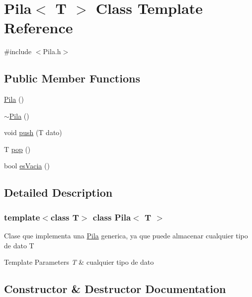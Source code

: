 \hypertarget{class_pila}{}\section{Pila$<$ T $>$ Class Template Reference}
\label{class_pila}


{\ttfamily \#include $<$Pila.\+h$>$}

\subsection*{Public Member Functions}
\begin{DoxyCompactItemize}
\item 
\mbox{\hyperlink{class_pila_a7ff5138a6888873379192365d7acbde4}{Pila}} ()
\item 
\mbox{\hyperlink{class_pila_a5bc38b4a06fdc0c1abc8736ebc5ba839}{$\sim$\+Pila}} ()
\item 
void \mbox{\hyperlink{class_pila_a6de443a0634a3f5d3c1c52e640b408c9}{push}} (T dato)
\item 
T \mbox{\hyperlink{class_pila_a9250ad4ed594b141d6cdeacc6684ff9a}{pop}} ()
\item 
bool \mbox{\hyperlink{class_pila_a8d946f60460f1a02ad0880acc1aa679e}{es\+Vacia}} ()
\end{DoxyCompactItemize}


\subsection{Detailed Description}
\subsubsection*{template$<$class T$>$\newline
class Pila$<$ T $>$}

Clase que implementa una \mbox{\hyperlink{class_pila}{Pila}} generica, ya que puede almacenar cualquier tipo de dato T 
\begin{DoxyTemplParams}{Template Parameters}
{\em T} & cualquier tipo de dato \\
\hline
\end{DoxyTemplParams}


\subsection{Constructor \& Destructor Documentation}
\mbox{\label{class_pila_a7ff5138a6888873379192365d7acbde4}} 

